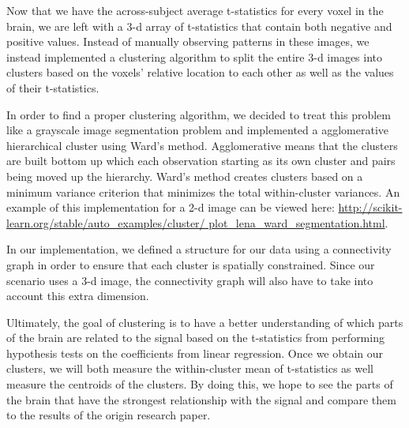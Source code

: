 \par Now that we have the across-subject average t-statistics for every voxel 
in the brain, we are left with a 3-d array of t-statistics that contain both 
negative and positive values. Instead of manually observing patterns in these 
images, we instead implemented a clustering algorithm to split the entire 3-d 
images into clusters based on the voxels' relative location to each other as 
well as the values of their t-statistics.

\par In order to find a proper clustering algorithm, we decided to treat this 
problem like a grayscale image segmentation problem and implemented a 
agglomerative hierarchical cluster using Ward's method. Agglomerative means 
that the clusters are built bottom up which each observation starting as its 
own cluster and pairs being moved up the hierarchy. Ward's method creates 
clusters based on a minimum variance criterion that minimizes the total 
within-cluster variances. An example of this implementation for a 2-d image can 
be viewed here: \url{http://scikit-learn.org/stable/auto_examples/cluster/
plot_lena_ward_segmentation.html}.

In our implementation, we defined a structure for our data using a connectivity 
graph in order to ensure that each cluster is spatially constrained. Since 
our scenario uses a 3-d image, the connectivity graph will also have to take 
into account this extra dimension.

\par Ultimately, the goal of clustering is to have a better understanding of 
which parts of the brain are related to the signal based on the t-statistics 
from performing hypothesis tests on the coefficients from linear regression.
Once we obtain our clusters, we will both measure the within-cluster mean of
t-statistics as well measure the centroids of the clusters. By doing this, we hope
to see the parts of the brain that have the strongest relationship with the
signal and compare them to the results of the origin research paper.



